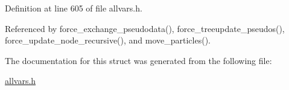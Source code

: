 Definition at line 605 of file allvars.h.



Referenced by force\_\-exchange\_\-pseudodata(), force\_\-treeupdate\_\-pseudos(), force\_\-update\_\-node\_\-recursive(), and move\_\-particles().



The documentation for this struct was generated from the following file:\begin{DoxyCompactItemize}
\item 
\hyperlink{allvars_8h}{allvars.h}\end{DoxyCompactItemize}
